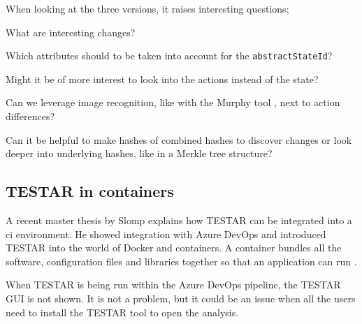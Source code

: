 When looking at the three versions, it raises interesting questions; 

What are interesting changes? 

Which attributes should to be taken into account for the \verb|abstractStateId|? 

Might it be of more interest to look into the actions instead of the state? 

Can we leverage image recognition, like with the Murphy tool \cite{murphy-extract-gui}, next to action differences? 

Can it be helpful to make hashes of combined hashes to discover changes or look deeper into underlying hashes, like in a Merkle tree \cite{merkle-tree} structure?

\subsection{TESTAR in containers}
A recent master thesis by Slomp explains how TESTAR can be integrated into a \acrfull{ci} environment. He showed integration with Azure DevOps and introduced TESTAR into the world of Docker and containers. A container bundles all the software, configuration files and libraries together so that an application can run \cite{ms-container}. 

When TESTAR is being run within the Azure DevOps pipeline, the TESTAR GUI is not shown. It is not a problem, but it could be an issue when all the users need to install the TESTAR tool to open the analysis.  